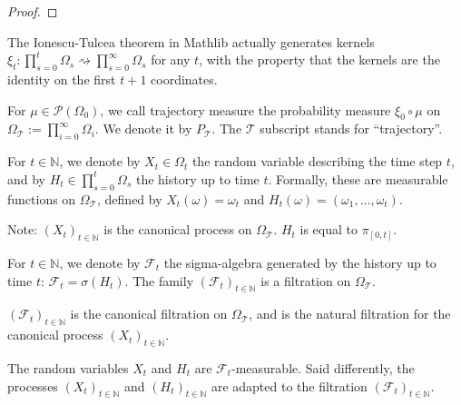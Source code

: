 \begin{proof}\leanok
\end{proof}

The Ionescu-Tulcea theorem in Mathlib \cite{marion2025formalization} actually generates kernels $\xi_t : \prod_{s=0}^t \Omega_s \rightsquigarrow \prod_{s=0}^{\infty} \Omega_s$ for any $t$, with the property that the kernels are the identity on the first $t+1$ coordinates.

\begin{definition}\label{def:trajMeasure}
  \leanok
For $\mu \in \mathcal{P}(\Omega_0)$, we call trajectory measure the probability measure $\xi_0 \circ \mu$ on $\Omega_{\mathcal{T}} := \prod_{i=0}^{\infty} \Omega_i$.
We denote it by $P_{\mathcal{T}}$.
The $\mathcal{T}$ subscript stands for ``trajectory''.
\end{definition}


\begin{definition}\label{def:IT.history}
  \leanok
For $t \in \mathbb{N}$, we denote by $X_t \in \Omega_t$ the random variable describing the time step $t$, and by $H_t \in \prod_{s=0}^t \Omega_s$ the history up to time $t$.
Formally, these are measurable functions on $\Omega_{\mathcal{T}}$, defined by $X_t(\omega) = \omega_t$ and $H_t(\omega) = (\omega_1, \ldots, \omega_t)$.
\end{definition}

Note: $(X_t)_{t \in \mathbb{N}}$ is the canonical process on $\Omega_{\mathcal{T}}$. $H_t$ is equal to $\pi_{[0,t]}$.


\begin{definition}[Filtration]\label{def:IT.filtration}
  \leanok
For $t \in \mathbb{N}$, we denote by $\mathcal{F}_t$ the sigma-algebra generated by the history up to time $t$: $\mathcal{F}_t = \sigma(H_t)$.
The family $(\mathcal{F}_t)_{t \in \mathbb{N}}$ is a filtration on $\Omega_{\mathcal{T}}$.
\end{definition}

$(\mathcal{F}_t)_{t \in \mathbb{N}}$ is the canonical filtration on $\Omega_{\mathcal{T}}$, and is the natural filtration for the canonical process $(X_t)_{t \in \mathbb{N}}$.


\begin{lemma}\label{lem:IT.adapted_history}
  \leanok
The random variables $X_t$ and $H_t$ are $\mathcal{F}_t$-measurable.
Said differently, the processes $(X_t)_{t \in \mathbb{N}}$ and $(H_t)_{t \in \mathbb{N}}$ are adapted to the filtration $(\mathcal{F}_t)_{t \in \mathbb{N}}$.
\end{lemma}


